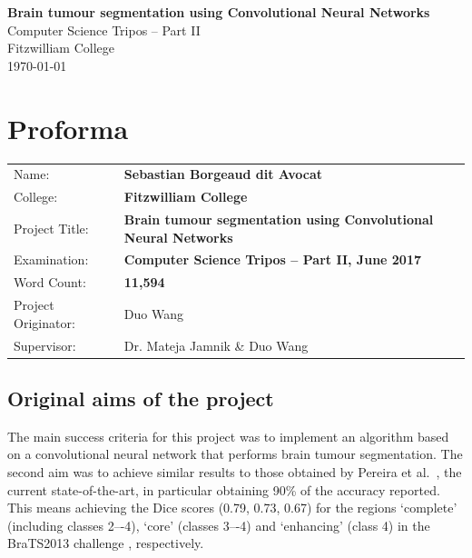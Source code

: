 \documentclass[12pt,a4paper,twoside,openright]{report}
\begin{document}





\pagestyle{empty}


\vspace*{60mm}
\begin{center}
\Huge
\textbf{Brain tumour segmentation using Convolutional Neural Networks} \\[5mm]
Computer Science Tripos -- Part II \\[5mm]
Fitzwilliam College \\[5mm]
\today  %
\end{center}


\pagestyle{plain}

\chapter*{Proforma}

{\large
\begin{tabular}{lp{12cm}}
Name:               & \bf Sebastian Borgeaud dit Avocat                       \\
College:            & \bf Fitzwilliam College                     \\
Project Title:      & \bf Brain tumour segmentation using Convolutional Neural Networks\\
Examination:        & \bf Computer Science Tripos -- Part II, June 2017  \\
Word Count:         & \bf 11,594  \\
Project Originator: & Duo Wang                    \\
Supervisor:         & Dr. Mateja Jamnik \& Duo Wang                    \\ 
\end{tabular}
}
\section*{Original aims of the project}
The main success criteria for this project was to implement an algorithm based on a convolutional neural network that performs brain tumour segmentation. The second aim was to achieve similar results to those obtained by Pereira et al.\ \cite{pereira}, the current \mbox{state-of-the-art}, in particular obtaining 90\% of the accuracy reported. This means achieving the Dice scores (0.79, 0.73, 0.67) for the regions `complete' (including classes 2–-4), ‘core’ (classes 3–-4) and ‘enhancing’ (class 4) in the BraTS2013 challenge \cite{brats-proceedings}, respectively.
\end{document}
